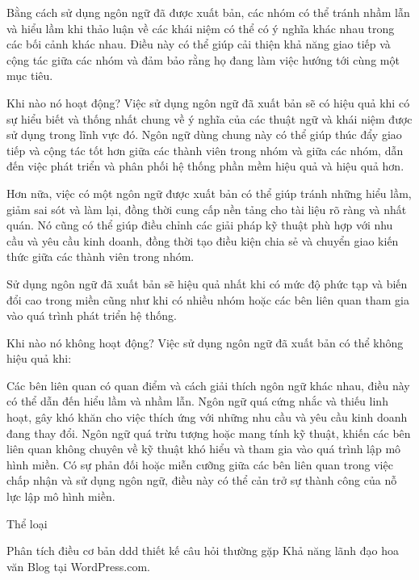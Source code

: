 Bằng cách sử dụng ngôn ngữ đã được xuất bản, các nhóm có thể tránh nhầm lẫn và hiểu lầm khi thảo luận về các khái niệm có thể có ý nghĩa khác nhau trong các bối cảnh khác nhau. Điều này có thể giúp cải thiện khả năng giao tiếp và cộng tác giữa các nhóm và đảm bảo rằng họ đang làm việc hướng tới cùng một mục tiêu.

Khi nào nó hoạt động?
Việc sử dụng ngôn ngữ đã xuất bản sẽ có hiệu quả khi có sự hiểu biết và thống nhất chung về ý nghĩa của các thuật ngữ và khái niệm được sử dụng trong lĩnh vực đó. Ngôn ngữ dùng chung này có thể giúp thúc đẩy giao tiếp và cộng tác tốt hơn giữa các thành viên trong nhóm và giữa các nhóm, dẫn đến việc phát triển và phân phối hệ thống phần mềm hiệu quả và hiệu quả hơn.

Hơn nữa, việc có một ngôn ngữ được xuất bản có thể giúp tránh những hiểu lầm, giảm sai sót và làm lại, đồng thời cung cấp nền tảng cho tài liệu rõ ràng và nhất quán. Nó cũng có thể giúp điều chỉnh các giải pháp kỹ thuật phù hợp với nhu cầu và yêu cầu kinh doanh, đồng thời tạo điều kiện chia sẻ và chuyển giao kiến ​​thức giữa các thành viên trong nhóm.

Sử dụng ngôn ngữ đã xuất bản sẽ hiệu quả nhất khi có mức độ phức tạp và biến đổi cao trong miền cũng như khi có nhiều nhóm hoặc các bên liên quan tham gia vào quá trình phát triển hệ thống.

Khi nào nó không hoạt động?
Việc sử dụng ngôn ngữ đã xuất bản có thể không hiệu quả khi:

Các bên liên quan có quan điểm và cách giải thích ngôn ngữ khác nhau, điều này có thể dẫn đến hiểu lầm và nhầm lẫn.
Ngôn ngữ quá cứng nhắc và thiếu linh hoạt, gây khó khăn cho việc thích ứng với những nhu cầu và yêu cầu kinh doanh đang thay đổi.
Ngôn ngữ quá trừu tượng hoặc mang tính kỹ thuật, khiến các bên liên quan không chuyên về kỹ thuật khó hiểu và tham gia vào quá trình lập mô hình miền.
Có sự phản đối hoặc miễn cưỡng giữa các bên liên quan trong việc chấp nhận và sử dụng ngôn ngữ, điều này có thể cản trở sự thành công của nỗ lực lập mô hình miền.

Thể loại

Phân tích
điều cơ bản
ddd
thiết kế
câu hỏi thường gặp
Khả năng lãnh đạo
hoa văn
Blog tại WordPress.com.
